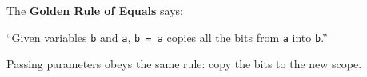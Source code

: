 The \textbf{Golden Rule of Equals} says:

``Given variables \lstinline$b$ and \lstinline$a$, \lstinline$b = a$ copies all
the bits from \lstinline$a$ into \lstinline$b$.''

Passing parameters obeys the same rule: copy the bits to the new scope.
